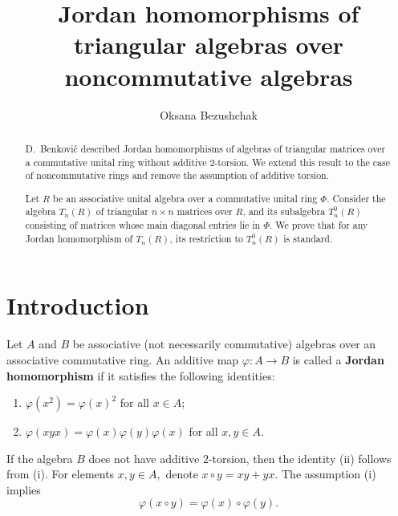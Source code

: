 \documentclass[12pt]{amsart}
\begin{document}
{\fontsize{12pt}{17pt}\selectfont
\title{Jordan homomorphisms of triangular algebras over noncommutative algebras}


\author{Oksana Bezushchak}
\address{Oksana Bezushchak: Faculty of Mechanics and Mathematics, Taras Shevchenko National University of Kyiv, Volodymyrska, 60, Kyiv 01033, Ukraine}



\maketitle

\begin{abstract}
	D.~Benkovi\v{c} described Jordan homomorphisms of algebras of triangular matrices over 
	a commutative unital ring without additive $2$-torsion. 
	We extend this result to the case of noncommutative rings and remove the assumption of additive torsion.
	
Let $R$ be an associative unital algebra over a commutative unital ring $\Phi$.  
Consider the algebra $T_n(R)$ of triangular $n \times n$ matrices over $R$, and its subalgebra $T_n^0(R)$ consisting of matrices whose main diagonal entries lie in $\Phi$.  
We prove that for any Jordan homomorphism of $T_n(R)$, its restriction to $T_n^0(R)$ is standard.
\end{abstract}




\section{Introduction}


Let $A$ and $B$ be  associative (not necessarily commutative)  algebras over an associative commutative ring. An additive map $\varphi: A\to B$ is called a \textbf{Jordan homomorphism} if it  satisfies the following identities:

\begin{enumerate}
	\item[(i)]  $\varphi(x^2)= \varphi(x)^2$ for all $x\in A$;
	\item[(ii)] $\varphi(xyx)= \varphi(x) \varphi(y) \varphi(x)$ for all $x, y \in A$.
\end{enumerate}
If the algebra $B$ does not have additive $2$-torsion, then the identity (ii) follows from (i). For elements $x,y\in A,$ denote $x\circ y = xy+yx.$ The assumption (i) implies $$\varphi(x\circ y)= \varphi(x)\circ \varphi(y).$$

}
\end{document}
